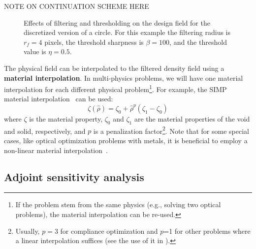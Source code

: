     NOTE ON CONTINUATION SCHEME HERE

    \begin{figure}[tb]
        \centering

        \caption{Effects of filtering and thresholding on the design field for the discretized
        version of a circle. For this example the filtering radius is $r_f=4$ pixels, the threshold sharpness is 
        $\beta=100$, and the threshold value is $\eta=0.5$.}
        \label{fig:ft}
    \end{figure}

    The physical field can be interpolated to the filtered density field using a
    \textbf{material interpolation}.
    In multi-physics problems, we will have one material interpolation for each
    different physical problem\footnote{If the problem stem from the same physics
        (e.g., solving two optical problems), the material interpolation can be
        re-used.}.
    For example, the SIMP material interpolation~\cite{SIMP} can be used:
    \begin{equation}
        \zeta(\hat{\rho})=\zeta_0+\hat{\rho}^p\left(\zeta_1-\zeta_0\right)
    \end{equation}
    where $\zeta$ is the material property, $\zeta_0$ and $\zeta_1$ are the
    material properties of the void and solid, respectively, and $p$
    is a penalization factor\footnote{Usually, $p=3$ for compliance optimization and $p$=1
    for other problems where a linear interpolation suffices (see the use of it in \cite{ownpub3,ownpub4}).}. Note that for some
    special cases, like optical optimization problems with metals, it is beneficial
    to employ a non-linear material interpolation~\cite{nonlinear_interp,ownpub0}.

    \subsection*{Adjoint sensitivity analysis}

